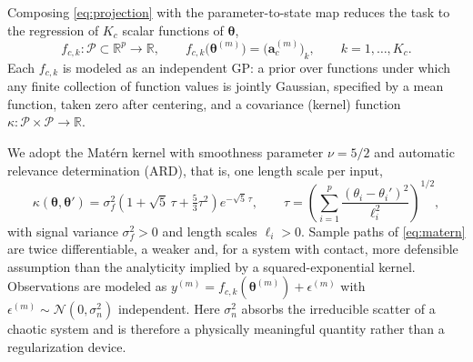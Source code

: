 \documentclass[11pt]{article}
\newcommand{\R}{\mathbb{R}}
\newcommand{\bs}[1]{\boldsymbol{#1}}
\begin{document}
Composing \eqref{eq:projection} with the parameter-to-state map reduces the task to the
regression of $K_c$ scalar functions of $\bs{\theta}$,
\begin{equation}
  f_{c,k} : \mathcal{P} \subset \R^{p} \to \R,
  \qquad
  f_{c,k}\big(\bs{\theta}^{(m)}\big) = \big( \bs{a}_c^{(m)} \big)_k,
  \qquad k = 1, \ldots, K_c .
  \label{eq:regression-task}
\end{equation}
Each $f_{c,k}$ is modeled as an independent GP: a prior over functions under which any
finite collection of function values is jointly Gaussian, specified by a mean function, taken
zero after centering, and a covariance (kernel) function $\kappa : \mathcal{P} \times
\mathcal{P} \to \R$.

We adopt the Mat\'ern kernel with smoothness parameter $\nu = 5/2$ and automatic relevance
determination (ARD), that is, one length scale per input,
\begin{equation}
  \kappa(\bs{\theta}, \bs{\theta}') = \sigma_f^2
  \left( 1 + \sqrt{5}\, \tau + \tfrac{5}{3} \tau^2 \right) e^{-\sqrt{5}\,\tau},
  \qquad
  \tau = \left( \sum_{i=1}^{p} \frac{(\theta_i - \theta_i')^2}{\ell_i^2} \right)^{1/2},
  \label{eq:matern}
\end{equation}
with signal variance $\sigma_f^2 > 0$ and length scales $\ell_i > 0$. Sample paths of
\eqref{eq:matern} are twice differentiable, a weaker and, for a system with contact, more
defensible assumption than the analyticity implied by a squared-exponential kernel.
Observations are modeled as $y^{(m)} = f_{c,k}(\bs{\theta}^{(m)}) + \epsilon^{(m)}$ with
$\epsilon^{(m)} \sim \mathcal{N}(0, \sigma_n^2)$ independent. Here $\sigma_n^2$ absorbs the
irreducible scatter of a chaotic system and is therefore a physically meaningful quantity
rather than a regularization device.
\end{document}
